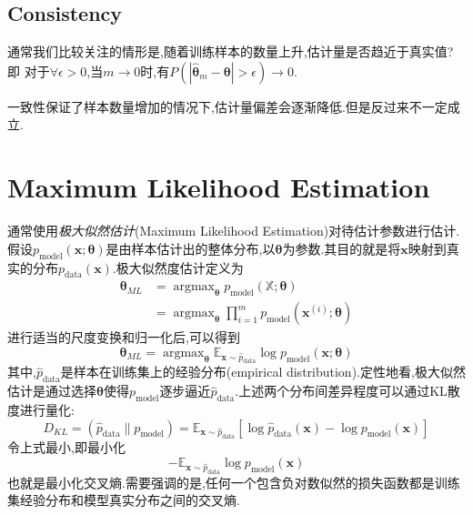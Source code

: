 \subsection{Consistency}\label{subsec:consistency}

通常我们比较关注的情形是,随着训练样本的数量上升,估计量是否趋近于真实值?即
对于$\forall\epsilon>0$,当$m\to0$时,有$P(|\hat{\bm\theta}_m-{\bm\theta}|>\epsilon)\to0$.

一致性保证了样本数量增加的情况下,估计量偏差会逐渐降低.但是反过来不一定成立.

\section{Maximum Likelihood Estimation}

通常使用\textit{极大似然估计}(Maximum Likelihood Estimation)对待估计参数进行估计.假设$p_{\text{model}}(\bm x;{\bm\theta})$是由样本估计出的整体分布,以${\bm\theta}$为参数.其目的就是将$\bm x$映射到真实的分布$p_{\text{data}}(\bm x)$.极大似然度估计定义为
\begin{equation}\begin{split}
{\bm\theta}_{ML}&=\mathop{\arg\max}_{{\bm\theta}}p_{\text{model}}(\mathbb X;{\bm\theta})\\
&=\mathop{\arg\max}_{{\bm\theta}}\prod_{i=1}^mp_{\text{model}}(\bm x^{(i)};{\bm\theta})
\end{split}\end{equation}
进行适当的尺度变换和归一化后,可以得到
\begin{equation}
{\bm\theta}_{ML}=\mathop{\arg\max}_{{\bm\theta}}\mathbb E_{\bm x\sim\hat p_{\text{data}}}\log p_{\text{model}}(\bm x;{\bm\theta})
\end{equation}
其中,$\hat p_{\text{data}}$是样本在训练集上的经验分布(empirical distribution).定性地看,极大似然估计是通过选择${\bm\theta}$使得$p_{\text{model}}$逐步逼近$\hat p_{\text{data}}$.上述两个分布间差异程度可以通过KL散度进行量化:
\begin{equation}
D_{KL}=(\hat p_{\text{data}}\|p_{\text{model}})=\mathbb E_{\bm x\sim\hat p_{\text{data}}}[\log\hat p_{\text{data}}(\bm x)-\log p_{\text{model}}(\bm x)]
\end{equation}
令上式最小,即最小化
\begin{equation}
-\mathbb E_{\bm x\sim\hat p_{\text{data}}}\log p_{\text{model}}(\bm x)
\end{equation}
也就是最小化交叉熵.需要强调的是,任何一个包含负对数似然的损失函数都是训练集经验分布和模型真实分布之间的交叉熵.

